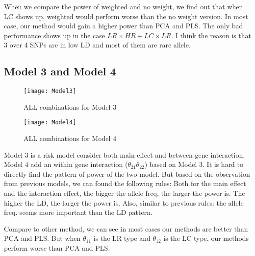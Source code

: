 \documentclass{article}
\begin{document}
        When we compare the power of weighted and no weight, we find out that when LC shows up, weighted would perform worse than the no weight version. In most case, our method would gain a higher power than PCA and PLS. The only bad performance shows up in the case  $LR\times HR+LC\times LR$. I think the reason is that 3 over 4 SNPs are in low LD and most of them are rare allele.
    
    \subsection{Model 3 and Model 4}
        \begin{figure}[htbp]
            \centering
            \texttt{[image: Model3]}
            \caption{ALL combinations for Model 3}
        \end{figure}
        \begin{figure}[htbp]
            \centering
            \texttt{[image: Model4]}
            \caption{ALL combinations for Model 4}
        \end{figure}
        
        Model 3 is a risk model consider both main effect and between gene interaction. Model 4 add an within gene interaction ($\theta_{21}\theta_{22}$) based on Model 3. It is hard to directly find the pattern of power of the two model. But based on the observation from previous models, we can found the following rules:  Both for the main effect and the interaction effect, the bigger the allele freq, the larger the power is. The higher the LD, the larger the power is. Also, similar to previous rules: the allele freq. seems more important than the LD pattern.
        
        Compare to other method, we can see in most cases our methods are better than PCA and PLS. But when $\theta_{11}$ is the LR type and $\theta_{12}$ is the LC type, our methods perform worse than PCA and PLS.
        
        
\end{document}
